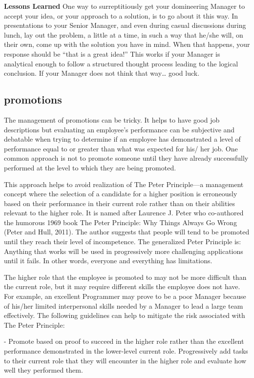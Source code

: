 \documentclass{book}
\begin{document}
\textbf{Lessons Learned} One way to surreptitiously
get your domineering Manager to accept your
idea, or your approach to a solution, is to go
about it this way. In presentations to your
Senior Manager, and even during casual discussions
during lunch, lay out the problem, a
little at a time, in such a way that he/she will, on
their own, come up with the solution you have
in mind. When that happens, your response
should be “that is a great idea!” This works if
your Manager is analytical enough to follow a
structured thought process leading to the logical
conclusion. If your Manager does not think that
way… good luck.

\subsection{promotions}

The management of promotions can be tricky. It helps to
have good job descriptions but evaluating an employee’s performance
can be subjective and debatable when trying to
determine if an employee has demonstrated a level of performance
equal to or greater than what was expected for his/
her job. One common approach is not to promote someone
until they have already successfully performed at the level to
which they are being promoted.

This approach helps to avoid realization of The Peter
Principle—a management concept where the selection
of a candidate for a higher position is erroneously based
on their performance in their current role rather than on
their abilities relevant to the higher role. It is named after
Laurence J. Peter who co-authored the humorous 1969
book The Peter Principle: Why Things Always Go Wrong
(Peter and Hull, 2011). The author suggests that people
will tend to be promoted until they reach their level of
incompetence. The generalized Peter Principle is: Anything
that works will be used in progressively more challenging
applications until it fails. In other words, everyone and
everything has limitations.

The higher role that the employee is promoted to may
not be more difficult than the current role, but it may require
different skills the employee does not have. For example,
an excellent Programmer may prove to be a poor Manager
because of his/her limited interpersonal skills needed by a
Manager to lead a large team effectively. The following
guidelines can help to mitigate the risk associated with The
Peter Principle:

- Promote based on proof to succeed in the higher role
rather than the excellent performance demonstrated in
the lower-level current role. Progressively add tasks to
their current role that they will encounter in the higher
role and evaluate how well they performed them.
\end{document}
